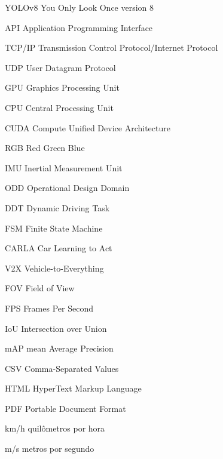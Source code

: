 \documentclass[
	12pt,				%
	oneside, %
	a4paper,			%
	english,			%
	french,				%
	spanish,			%
	brazil				%
	]{abntex2}
\let\cleardoublepage\clearpage %
\begin{document}
\begin{siglas}
    \item[YOLOv8] You Only Look Once version 8
    \item[API] Application Programming Interface
    \item[TCP/IP] Transmission Control Protocol/Internet Protocol
    \item[UDP] User Datagram Protocol
    \item[GPU] Graphics Processing Unit
    \item[CPU] Central Processing Unit
    \item[CUDA] Compute Unified Device Architecture
    \item[RGB] Red Green Blue
    \item[IMU] Inertial Measurement Unit
    \item[ODD] Operational Design Domain
    \item[DDT] Dynamic Driving Task
    \item[FSM] Finite State Machine
    \item[CARLA] Car Learning to Act
    \item[V2X] Vehicle-to-Everything
    \item[FOV] Field of View
    \item[FPS] Frames Per Second
    \item[IoU] Intersection over Union
    \item[mAP] mean Average Precision
    \item[CSV] Comma-Separated Values
    \item[HTML] HyperText Markup Language
    \item[PDF] Portable Document Format
    \item[km/h] quilômetros por hora
    \item[m/s] metros por segundo
\end{siglas}



\tableofcontents*
\cleardoublepage



\textual

\end{document}

